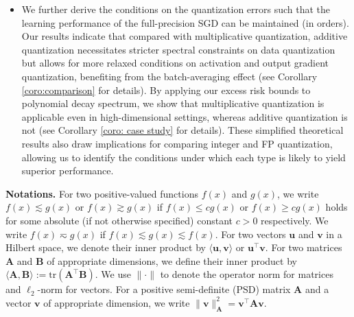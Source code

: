 \documentclass[11pt, letterpaper]{article}
\begin{document}
\begin{itemize}[leftmargin=*]
\item We further derive the conditions on the quantization errors such that the learning performance of the full-precision SGD can be maintained (in orders). Our results indicate that compared with multiplicative quantization, additive quantization necessitates stricter spectral constraints on data quantization but allows for more relaxed conditions on activation and output gradient quantization, benefiting from the batch-averaging effect (see Corollary \ref{coro:comparison} for details). By applying our excess risk bounds to polynomial decay spectrum, we show that multiplicative quantization is applicable even in high-dimensional settings, whereas additive quantization is not (see Corollary \ref{coro: case study} for details). These simplified theoretical results also draw implications for comparing integer and FP quantization, allowing us to identify the conditions under which each type is likely to yield superior performance.


\end{itemize}

\textbf{Notations.} For two positive-valued functions $f(x)$ and $g(x)$, we write $f(x) \lesssim g(x)$ or $f(x) \gtrsim g(x)$ if $f(x) \leq cg(x)$ or $f(x) \geq cg(x)$ holds for some absolute (if not otherwise specified) constant $c > 0$ respectively. We write $f(x) \eqsim g(x)$ if $f(x) \lesssim g(x) \lesssim f(x)$. For two vectors $\mathbf{u}$ and $\mathbf{v}$ in a Hilbert space, we denote their inner product by $\langle \mathbf{u},\mathbf{v}\rangle$ or $\mathbf{u}^\top\mathbf{v}$. For two matrices $\mathbf{A}$ and $\mathbf{B}$ of appropriate dimensions, we define their inner product by $\langle \mathbf{A},\mathbf{B}\rangle := \mathrm{tr}\left(\mathbf{A}^\top\mathbf{B}\right)$. We use $\|\cdot \|$ to denote the operator norm for matrices and $\ell_2$-norm for vectors. For a positive semi-definite (PSD) matrix $\mathbf{A}$ and a vector $\mathbf{v}$ of appropriate dimension, we write $\|\mathbf{v}\|_\mathbf{A}^2=\mathbf{v}^\top \mathbf{A}\mathbf{v}$.%
\end{document}
